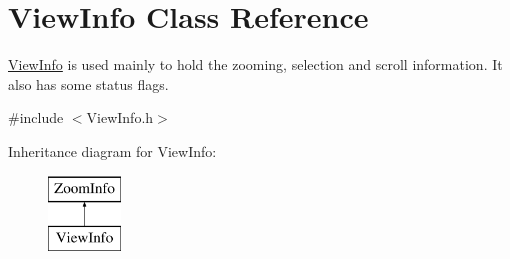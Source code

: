 \hypertarget{class_view_info}{}\section{View\+Info Class Reference}
\label{class_view_info}


\hyperlink{class_view_info}{View\+Info} is used mainly to hold the zooming, selection and scroll information. It also has some status flags.  




{\ttfamily \#include $<$View\+Info.\+h$>$}

Inheritance diagram for View\+Info\+:\begin{figure}[H]
\begin{center}
\leavevmode
\includegraphics[height=2.000000cm]{class_view_info}
\end{center}
\end{figure}
